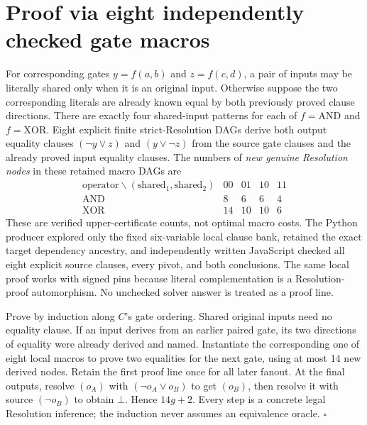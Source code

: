 \documentclass[11pt]{article}
\begin{document}
\section*{Proof via eight independently checked gate macros}
For corresponding gates $y=f(a,b)$ and $z=f(c,d)$, a pair of inputs may be literally shared only when it is an original input. Otherwise suppose the two corresponding literals are already known equal by both previously proved clause directions. There are exactly four shared-input patterns for each of $f=\mathrm{AND}$ and $f=\mathrm{XOR}$. Eight explicit finite strict-Resolution DAGs derive both output equality clauses $(\neg y\vee z)$ and $(y\vee\neg z)$ from the source gate clauses and the already proved input equality clauses. The numbers of \emph{new genuine Resolution nodes} in these retained macro DAGs are
\[
\begin{array}{c|rrrr}
\mathrm{operator}\backslash(\mathrm{shared}_1,\mathrm{shared}_2)&00&01&10&11\\\hline
\mathrm{AND}&8&6&6&4\\
\mathrm{XOR}&14&10&10&6
\end{array}
\]
These are verified upper-certificate counts, not optimal macro costs. The Python producer explored only the fixed six-variable local clause bank, retained the exact target dependency ancestry, and independently written JavaScript checked all eight explicit source clauses, every pivot, and both conclusions. The same local proof works with signed pins because literal complementation is a Resolution-proof automorphism. No unchecked solver answer is treated as a proof line.

Prove by induction along $C$'s gate ordering. Shared original inputs need no equality clause. If an input derives from an earlier paired gate, its two directions of equality were already derived and named. Instantiate the corresponding one of eight local macros to prove two equalities for the next gate, using at most 14 new derived nodes. Retain the first proof line once for all later fanout. At the final outputs, resolve $(o_A)$ with $(\neg o_A\vee o_B)$ to get $(o_B)$, then resolve it with source $(\neg o_B)$ to obtain $\bot$. Hence $14g+2$. Every step is a concrete legal Resolution inference; the induction never assumes an equivalence oracle. \hfill$\square$
\end{document}
